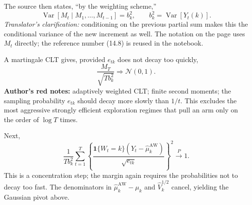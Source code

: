 The source then states, ``by the weighting scheme,''
\[
 \operatorname{Var}[M_t\mid M_1,\ldots,M_{t-1}]=b_k^2,
 \qquad b_k^2=\operatorname{Var}[Y_t(k)].\tag{14.8, as labeled in the scan}
\]
\textit{Translator's clarification:} conditioning on the previous partial sum makes this the conditional variance of the new increment as well. The notation on the page uses $M_t$ directly; the reference number (14.8) is reused in the notebook.

A martingale CLT gives, provided $e_{tk}$ does not decay too quickly,
\[
 \frac{M_T}{\sqrt{Tb_k^2}}\Rightarrow\mathcal N(0,1).
\]
\textbf{Author's red notes:} adaptively weighted CLT; finite second moments; the sampling probability $e_{tk}$ should decay more slowly than $1/t$. This excludes the most aggressive strongly efficient exploration regimes that pull an arm only on the order of $\log T$ times.

Next,
\[
 \frac1{Tb_k^2}\sum_{t=1}^T
 \left\{\frac{\mathbf1\{W_t=k\}(Y_t-\widehat\mu_k^{\mathrm{AW}})}
 {\sqrt{e_{tk}}}\right\}^{\!2}
 \xrightarrow{P}1.
\]
This is a concentration step; the margin again requires the probabilities not to decay too fast. The denominators in $\widehat\mu_k^{\mathrm{AW}}-\mu_k$ and $\widehat V_k^{1/2}$ cancel, yielding the Gaussian pivot above.

